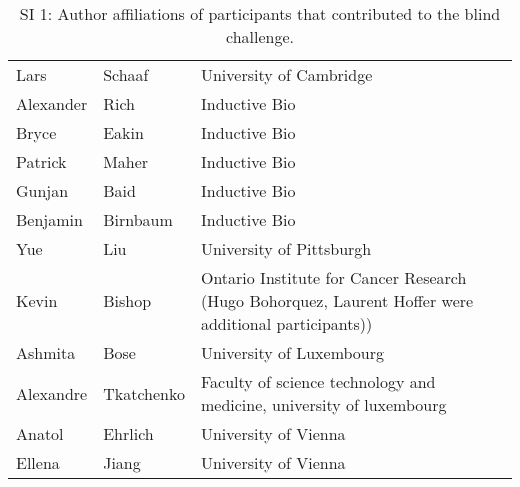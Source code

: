 \documentclass{article}
\begin{document}
\begin{table}[]
\begin{tabular}{lll}
\rowcolor[HTML]{F8F9FA} 
{\color[HTML]{434343} Lars} & {\color[HTML]{434343} Schaaf} & {\color[HTML]{434343} University of Cambridge} \\
\rowcolor[HTML]{FFFFFF} 
{\color[HTML]{434343} Alexander} & {\color[HTML]{434343} Rich} & {\color[HTML]{434343} Inductive Bio} \\
\rowcolor[HTML]{F8F9FA} 
{\color[HTML]{434343} Bryce} & {\color[HTML]{434343} Eakin} & {\color[HTML]{434343} Inductive Bio} \\
\rowcolor[HTML]{FFFFFF} 
{\color[HTML]{434343} Patrick} & {\color[HTML]{434343} Maher} & {\color[HTML]{434343} Inductive Bio} \\
\rowcolor[HTML]{F8F9FA} 
{\color[HTML]{434343} Gunjan} & {\color[HTML]{434343} Baid} & {\color[HTML]{434343} Inductive Bio} \\
\rowcolor[HTML]{FFFFFF} 
{\color[HTML]{434343} Benjamin} & {\color[HTML]{434343} Birnbaum} & {\color[HTML]{434343} Inductive Bio} \\
\rowcolor[HTML]{F8F9FA} 
{\color[HTML]{434343} Yue} & {\color[HTML]{434343} Liu} & {\color[HTML]{434343} University of Pittsburgh} \\
\rowcolor[HTML]{FFFFFF} 
{\color[HTML]{434343} Kevin} & {\color[HTML]{434343} Bishop} & {\color[HTML]{434343} Ontario Institute for Cancer Research (Hugo Bohorquez, Laurent Hoffer were additional participants))} \\
\rowcolor[HTML]{F8F9FA} 
{\color[HTML]{434343} Ashmita} & {\color[HTML]{434343} Bose} & {\color[HTML]{434343} University of Luxembourg} \\
\rowcolor[HTML]{FFFFFF} 
{\color[HTML]{434343} Alexandre} & {\color[HTML]{434343} Tkatchenko} & {\color[HTML]{434343} Faculty of science technology and medicine, university of luxembourg} \\
\rowcolor[HTML]{F8F9FA} 
{\color[HTML]{434343} Anatol} & {\color[HTML]{434343} Ehrlich} & {\color[HTML]{434343} University of Vienna} \\
\rowcolor[HTML]{FFFFFF} 
{\color[HTML]{434343} Ellena} & {\color[HTML]{434343} Jiang} & {\color[HTML]{434343} University of Vienna}
\end{tabular}
\caption{SI 1: Author affiliations of participants that contributed to the blind challenge.}
\end{table}
\end{document}

